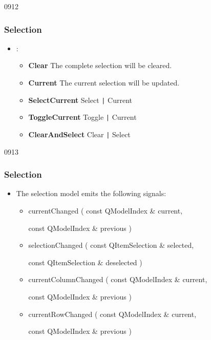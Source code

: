 \begin{slide}[fragile]{0912}
\frametitle{Selection}
\begin{itemize}
\item {}:
\begin{itemize}
\item \textbf{Clear} The complete selection will be cleared.
\item \textbf{Current} The current selection will be updated.\\

\item \textbf{SelectCurrent} Select \verb!|! Current 
\item \textbf{ToggleCurrent} Toggle \verb!|! Current
\item \textbf{ClearAndSelect} Clear \verb!|! Select
  \end{itemize}
\end{itemize}
\end{slide}

\begin{slide}{0913}\frametitle{Selection}
\begin{itemize}
\item The selection model emits the following signals:
  \begin{itemize}
  \item currentChanged ( const QModelIndex \& current,\\
    \strut\hspace{28.5mm}const QModelIndex \& previous )
  \item selectionChanged ( const QItemSelection \& selected,\\
    \strut\hspace{30.5mm}const QItemSelection \& deselected )
  \item currentColumnChanged ( const QModelIndex \& current,\\
    \strut\hspace{40.5mm}const QModelIndex \& previous )
  \item currentRowChanged ( const QModelIndex \& current,\\
    \strut\hspace{35mm}const QModelIndex \& previous )
  \end{itemize}
\end{itemize}
\end{slide}

